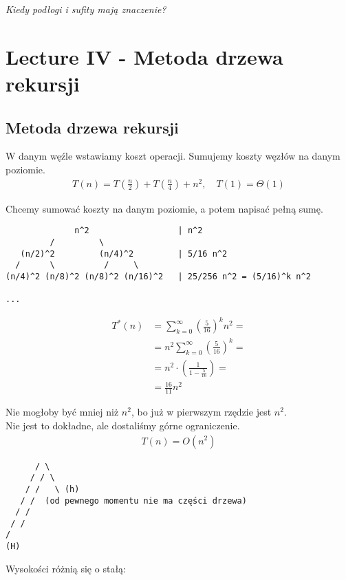 \documentclass{article}
\numberwithin{equation}{subsection}
\begin{document}
\textit{Kiedy podłogi i sufity mają znaczenie?}

\section{Lecture IV - Metoda drzewa rekursji}

\subsection{Metoda drzewa rekursji}

W danym węźle wstawiamy koszt operacji. Sumujemy koszty węzłów na danym poziomie.\\

\begin{align}
    T(n) = T\left(\frac{n}{2}\right) + T\left(\frac{n}{4}\right) + n^2, \quad T(1) = \Theta(1)
\end{align}

\noindent
Chcemy sumować koszty na danym poziomie, a potem napisać pełną sumę.

\begin{verbatim}
              n^2                  | n^2
         /         \ 
   (n/2)^2         (n/4)^2         | 5/16 n^2
  /      \          /     \
(n/4)^2 (n/8)^2 (n/8)^2 (n/16)^2   | 25/256 n^2 = (5/16)^k n^2

...
\end{verbatim}

\begin{align}
    T^{*}(n) &= \sum_{k=0}^{\infty} \left(\frac{5}{16}\right)^k n^2 = \\
    &= n^2 \sum_{k=0}^{\infty} \left(\frac{5}{16}\right)^k = \\
    &= n^2 \cdot \left(\frac{1}{1-\frac{5}{16}}\right) = \\
    &= \frac{16}{11} n^2
\end{align}

\noindent
Nie mogłoby być mniej niż $n^2$, bo już w pierwszym rzędzie jest $n^2$.\\
Nie jest to dokładne, ale dostaliśmy górne ograniczenie.\\

\begin{align}
    T(n) = O(n^2)
\end{align}

\begin{verbatim}
      / \
     / / \
    / /   \ (h)
   / /  (od pewnego momentu nie ma części drzewa)
  / /
 / /
/   
(H)
\end{verbatim}
Wysokości różnią się o stałą:
\end{document}
